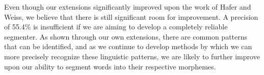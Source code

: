 \documentclass[11pt,letterpaper]{article}
\begin{document}
Even though our extensions significantly improved upon the work of Hafer and Weiss, we believe that there is still significant room for improvement. A precision of 55.4\% is insufficient if we are aiming to develop a completely reliable segmenter. As shown through our own extensions, there are common patterns that can be identified, and as we continue to develop methods by which we can more precisely recognize these linguistic patterns, we are likely to further improve upon our ability to segment words into their respective morphemes. \par



\end{document}
